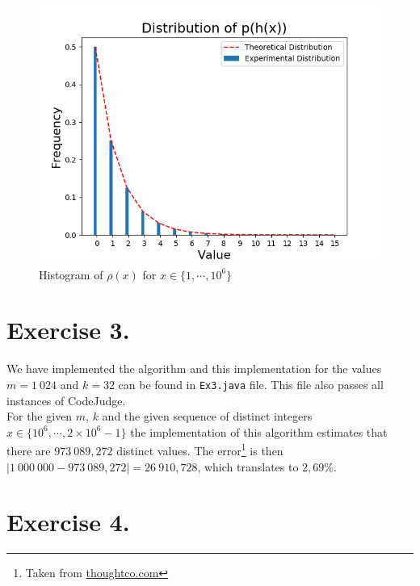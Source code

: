 \documentclass{tufte-handout}
\begin{document}
\begin{figure}[h!]
  \includegraphics[width = \textwidth]{figs/ex2-hist}
  \caption{Histogram of $\rho(x)$ for $x \in \{1,\cdots,10^6\}$}
  \label{fig:ex2}
\end{figure}

\section{\textbf{Exercise 3.}}

We have implemented the algorithm and this implementation for the values $m = 1\ 024$ and $k = 32$ can be found in {\tt Ex3.java} file. This file also passes all instances of CodeJudge.
\\\noindent
For the given $m$, $k$ and the given sequence of distinct integers $x \in \{10^6,\cdots,2\times 10^6 - 1\}$ the implementation of this algorithm estimates that there are $973\ 089,272$ distinct values. The error\footnote{Taken from \href{https://www.thoughtco.com/how-to-calculate-percent-error-609584}{thoughtco.com}} is then $|1\ 000\ 000 - 973\ 089,272| = 26\ 910,728$, which translates to $2,69\%$.

\section{\textbf{Exercise 4.}}
\end{document}
